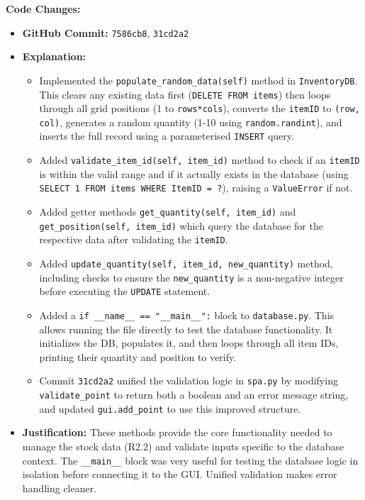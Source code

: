 \textbf{Code Changes:}
\begin{itemize}
	\item \textbf{GitHub Commit:} \verb|7586cb8|, \verb|31cd2a2|
	\item \textbf{Explanation:}
	\begin{itemize}
		\item Implemented the \verb|populate_random_data(self)| method in \verb|InventoryDB|. This clears any existing data first (\verb|DELETE FROM items|) then loops through all grid positions (1 to \verb|rows*cols|), converts the \verb|itemID| to \verb|(row, col)|, generates a random quantity (1-10 using \verb|random.randint|), and inserts the full record using a parameterised \verb|INSERT| query.
		\item Added \verb|validate_item_id(self, item_id)| method to check if an \verb|itemID| is within the valid range and if it actually exists in the database (using \verb|SELECT 1 FROM items WHERE ItemID = ?|), raising a \verb|ValueError| if not.
		\item Added getter methods \verb|get_quantity(self, item_id)| and \verb|get_position(self, item_id)| which query the database for the respective data after validating the \verb|itemID|.
		\item Added \verb|update_quantity(self, item_id, new_quantity)| method, including checks to ensure the \verb|new_quantity| is a non-negative integer before executing the \verb|UPDATE| statement.
		\item Added a \verb|if __name__ == "__main__":| block to \verb|database.py|. This allows running the file directly to test the database functionality. It initializes the DB, populates it, and then loops through all item IDs, printing their quantity and position to verify.
		\item Commit \verb|31cd2a2| unified the validation logic in \verb|spa.py| by modifying \verb|validate_point| to return both a boolean and an error message string, and updated \verb|gui.add_point| to use this improved structure.
	\end{itemize}
	\item \textbf{Justification:} These methods provide the core functionality needed to manage the stock data (R2.2) and validate inputs specific to the database context. The \verb|__main__| block was very useful for testing the database logic in isolation before connecting it to the GUI. Unified validation makes error handling cleaner.
\end{itemize}

